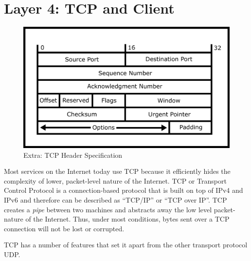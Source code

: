 \section{Layer 4: TCP and Client}


\begin{figure}[H]
  \centering
\includegraphics[width=.8\textwidth]{networking/drawings/tcp_header.png}
\caption{Extra: TCP Header Specification}
\end{figure}

Most services on the Internet today use \gls{TCP} because it efficiently hides the complexity of lower, packet-level nature of the Internet.
TCP or Transport Control Protocol is a connection-based protocol that is built on top of IPv4 and IPv6 and therefore can be described as ``TCP/IP'' or ``TCP over IP''.
TCP creates a \emph{pipe} between two machines and abstracts away the low level packet-nature of the Internet. Thus, under most conditions, bytes sent over a TCP connection will not be lost or corrupted.

TCP has a number of features that set it apart from the other transport protocol UDP.

